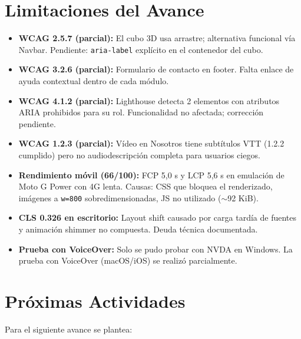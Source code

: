 \documentclass[12pt, a4paper]{article}
\begin{document}
\section{Limitaciones del Avance}

\begin{itemize}
  \item \textbf{WCAG 2.5.7 (parcial):} El cubo 3D usa arrastre; alternativa funcional vía Navbar. Pendiente: \texttt{aria-label} explícito en el contenedor del cubo.
  \item \textbf{WCAG 3.2.6 (parcial):} Formulario de contacto en footer. Falta enlace de ayuda contextual dentro de cada módulo.
  \item \textbf{WCAG 4.1.2 (parcial):} Lighthouse detecta 2 elementos con atributos ARIA prohibidos para su rol. Funcionalidad no afectada; corrección pendiente.
  \item \textbf{WCAG 1.2.3 (parcial):} Vídeo en Nosotros tiene subtítulos VTT (1.2.2 cumplido) pero no audiodescripción completa para usuarios ciegos.
  \item \textbf{Rendimiento móvil (66/100):} FCP 5,0 s y LCP 5,6 s en emulación de Moto G Power con 4G lenta. Causas: CSS que bloquea el renderizado, imágenes a \texttt{w=800} sobredimensionadas, JS no utilizado ($\sim$92 KiB).
  \item \textbf{CLS 0.326 en escritorio:} Layout shift causado por carga tardía de fuentes y animación shimmer no compuesta. Deuda técnica documentada.
  \item \textbf{Prueba con VoiceOver:} Solo se pudo probar con NVDA en Windows. La prueba con VoiceOver (macOS/iOS) se realizó parcialmente.
\end{itemize}

\section{Próximas Actividades}

Para el siguiente avance se plantea:
\end{document}
